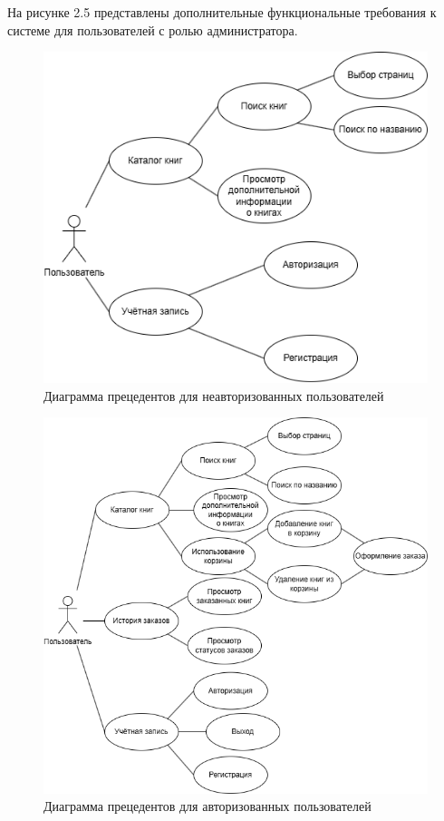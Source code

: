 На рисунке 2.5 представлены дополнительные функциональные требования к системе для пользователей с ролью администратора.

\begin{figure}[H]
	\centering
	\includegraphics[width=0.7\linewidth]{"images/Все_пользователи"}
	\caption{Диаграмма прецедентов для неавторизованных пользователей}
	\label{fig:--}
\end{figure}

\begin{figure}[H]
	\centering
	\includegraphics[width=0.7\linewidth]{"images/Авторизованные"}
	\caption{Диаграмма прецедентов для авторизованных пользователей}
	\label{fig:--}
\end{figure}

